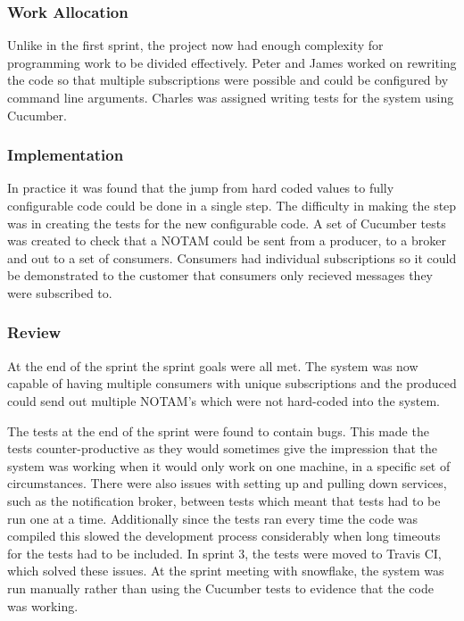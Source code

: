\documentclass[a4paper, 12pt, twoside]{article}
\begin{document}
\subsubsection{Work Allocation}

Unlike in the first sprint, the project now had enough complexity for programming work to be divided effectively. Peter and James worked on rewriting the code so that multiple subscriptions were possible and could be configured by command line arguments. Charles was assigned writing tests for the system using Cucumber.

\subsubsection{Implementation}

In practice it was found that the jump from hard coded values to fully configurable code could be done in a single step. The difficulty in making the step was in creating the tests for the new configurable code. A set of Cucumber tests was created to check that a NOTAM could be sent from a producer, to a broker and out to a set of consumers. Consumers had individual subscriptions so it could be demonstrated to the customer that consumers only recieved messages they were subscribed to.

\subsubsection{Review}

At the end of the sprint the sprint goals were all met. The system was now capable of having multiple consumers with unique subscriptions and the produced could send out multiple NOTAM's which were not hard-coded into the system. 

The tests at the end of the sprint were found to contain bugs. This made the tests counter-productive as they would sometimes give the impression that the system was working when it would only work on one machine, in a specific set of circumstances. There were also issues with setting up and pulling down services, such as the notification broker, between tests which meant that tests had to be run one at a time. Additionally since the tests ran every time the code was compiled this slowed the development process considerably when long timeouts for the tests had to be included. In sprint 3, the tests were moved to Travis CI, which solved these issues. At the sprint meeting with snowflake, the system was run manually rather than using the Cucumber tests to evidence that the code was working.
\end{document}

